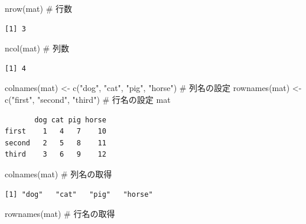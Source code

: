 \documentclass[
  letterpaper,
  DIV=11,
  numbers=noendperiod]{scrreprt}
\newenvironment{Shaded}{\begin{snugshade}}{\end{snugshade}}
\newcommand{\CommentTok}[1]{\textcolor[rgb]{0.37,0.37,0.37}{#1}}
\newcommand{\FunctionTok}[1]{\textcolor[rgb]{0.28,0.35,0.67}{#1}}
\newcommand{\NormalTok}[1]{\textcolor[rgb]{0.00,0.23,0.31}{#1}}
\newcommand{\OtherTok}[1]{\textcolor[rgb]{0.00,0.23,0.31}{#1}}
\newcommand{\StringTok}[1]{\textcolor[rgb]{0.13,0.47,0.30}{#1}}
\begin{document}
\begin{Shaded}
\begin{Highlighting}[]
\FunctionTok{nrow}\NormalTok{(mat) }\CommentTok{\# 行数}
\end{Highlighting}
\end{Shaded}

\begin{verbatim}
[1] 3
\end{verbatim}

\begin{Shaded}
\begin{Highlighting}[]
\FunctionTok{ncol}\NormalTok{(mat) }\CommentTok{\# 列数}
\end{Highlighting}
\end{Shaded}

\begin{verbatim}
[1] 4
\end{verbatim}

\begin{Shaded}
\begin{Highlighting}[]
\FunctionTok{colnames}\NormalTok{(mat) }\OtherTok{\textless{}{-}} \FunctionTok{c}\NormalTok{(}\StringTok{"dog"}\NormalTok{, }\StringTok{"cat"}\NormalTok{, }\StringTok{"pig"}\NormalTok{, }\StringTok{"horse"}\NormalTok{) }\CommentTok{\# 列名の設定}
\FunctionTok{rownames}\NormalTok{(mat) }\OtherTok{\textless{}{-}} \FunctionTok{c}\NormalTok{(}\StringTok{"first"}\NormalTok{, }\StringTok{"second"}\NormalTok{, }\StringTok{"third"}\NormalTok{) }\CommentTok{\# 行名の設定}
\NormalTok{mat}
\end{Highlighting}
\end{Shaded}

\begin{verbatim}
       dog cat pig horse
first    1   4   7    10
second   2   5   8    11
third    3   6   9    12
\end{verbatim}

\begin{Shaded}
\begin{Highlighting}[]
\FunctionTok{colnames}\NormalTok{(mat) }\CommentTok{\# 列名の取得}
\end{Highlighting}
\end{Shaded}

\begin{verbatim}
[1] "dog"   "cat"   "pig"   "horse"
\end{verbatim}

\begin{Shaded}
\begin{Highlighting}[]
\FunctionTok{rownames}\NormalTok{(mat) }\CommentTok{\# 行名の取得}
\end{Highlighting}
\end{Shaded}
\end{document}
